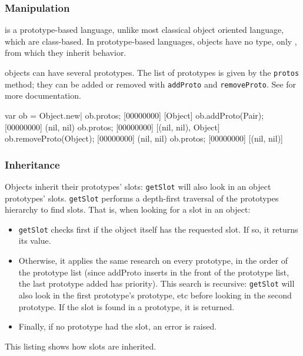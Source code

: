 \subsubsection{Manipulation}

\us is a prototype-based language, unlike most classical object
oriented language, which are class-based. In prototype-based
languages, objects have no type, only , from which they
inherit behavior.

\us objects can have several prototypes. The list of prototypes is
given by the \lstinline|protos| method; they can be added or removed
with \lstinline|addProto| and \lstinline|removeProto|.  See
 for more documentation.

\begin{urbiscript}
var ob = Object.new|
ob.protos;
[00000000] [Object]
ob.addProto(Pair);
[00000000] (nil, nil)
ob.protos;
[00000000] [(nil, nil), Object]
ob.removeProto(Object);
[00000000] (nil, nil)
ob.protos;
[00000000] [(nil, nil)]
\end{urbiscript}

\subsubsection{Inheritance}

Objects inherit their prototypes' slots: \lstinline|getSlot| will also
look in an object prototypes' slots. \lstinline|getSlot| performs a
depth-first traversal of the prototypes hierarchy to find slots. That
is, when looking for a slot in an object:

\begin{itemize}
\item \lstinline|getSlot| checks first if the object itself has the
  requested slot. If so, it returns its value.
\item Otherwise, it applies the same research on every prototype, in
  the order of the prototype list (since addProto inserts in the front
  of the prototype list, the last prototype added has priority). This
  search is recursive: \lstinline|getSlot| will also look in the first
  prototype's prototype, etc before looking in the second
  prototype. If the slot is found in a prototype, it is returned.
\item Finally, if no prototype had the slot, an error is raised.
\end{itemize}

This listing shows how slots are inherited.

